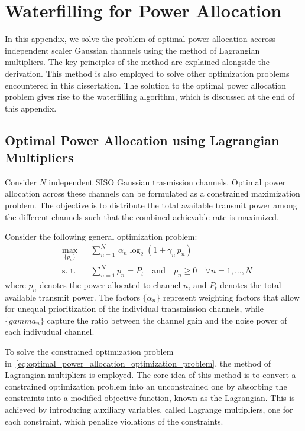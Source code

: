 \chapter{Waterfilling for Power Allocation}
\label{appendix:waterfilling}

In this appendix, we solve the problem of optimal power allocation accross independent scaler Gaussian channels using the method of Lagrangian multipliers.
The key principles of the method are explained alongside the derivation.
This method is also employed to solve other optimization problems encountered in this dissertation.
The solution to the optimal power allocation problem gives rise to the waterfilling algorithm, which is discussed at the end of this appendix.


\section{Optimal Power Allocation using Lagrangian Multipliers}
\label{app_section:optimal_power_allocation_using_lagrangian_multipliers}

Consider $N$ independent \ac{SISO} Gaussian trasmission channels.
Optimal power allocation across these channels can be formulated as a constrained maximization problem.
The objective is to distribute the total available transmit power among the different channels such that the combined achievable rate is maximized.

Consider the following general optimization problem:
\begin{equation}
\label{eq:optimal_power_allocation_optimization_problem}
\begin{aligned}
    & \underset{\{p_n\}}{\text{max}}
    & & \sum_{n=1}^{N} \, \alpha_n \log_2 \left( 1 + \gamma_n \, p_n \right) \\
    & \text{s. t.}
    & & \sum_{n=1}^{N} p_n = P_t \quad \text{and} \quad p_n \geq 0 \quad \forall n = 1, \dots, N
\end{aligned}
\end{equation}
where $p_n$ denotes the power allocated to channel $n$, and $P_t$ denotes the total available transmit power. 
The factors $\{\alpha_n\}$ represent weighting factors that allow for unequal prioritization of the individual transmission channels, while $\{gamma_n\}$ capture the ratio between the channel gain and the noise power of each indivudual channel.

To solve the constrained optimization problem in~\eqref{eq:optimal_power_allocation_optimization_problem}, the method of Lagrangian multipliers is employed.
The core idea of this method is to convert a constrained optimization problem into an unconstrained one by absorbing the constraints into a modified objective function, known as the Lagrangian.
This is achieved by introducing auxiliary variables, called Lagrange multipliers, one for each constraint, which penalize violations of the constraints.

